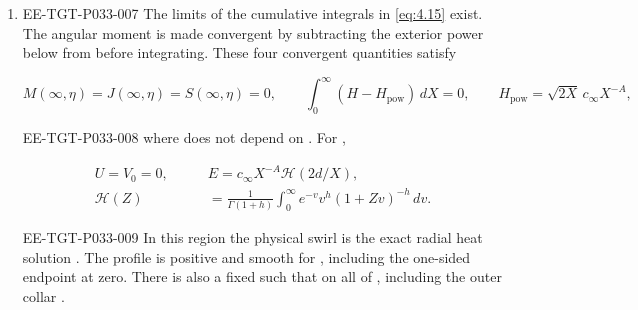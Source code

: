 \begin{theorem}
\begin{enumerate}[label=(\roman*)]
\item
\begin{EESegment}{EE-TGT-P033-007}
The limits 
of the cumulative integrals in \eqref{eq:4.15} exist. The angular moment is
made convergent by subtracting the exterior power
 below from
 before integrating. These four convergent quantities
satisfy
\end{EESegment}
\begin{equation}
  M(\infty,\eta)=J(\infty,\eta)=S(\infty,\eta)=0,\qquad
  \int_0^\infty(H-H_{\mathrm{pow}})\,dX=0,\qquad
  H_{\mathrm{pow}}=\sqrt{2X}\,c_\infty X^{-A},
  \tag{4.28}\label{eq:4.28}
\end{equation}
\begin{EESegment}{EE-TGT-P033-008}
where  does not depend on
. For ,
\end{EESegment}
\begin{equation}
\begin{aligned}
  U=V_0=0,\qquad&E=c_\infty X^{-A}\mathcal{H}(2d/X),\\
  \mathcal{H}(Z)&=\frac{1}{\Gamma(1+h)}\int_0^\infty e^{-v}v^h(1+Zv)^{-h}\,dv.
\end{aligned}
\tag{4.29}\label{eq:4.29}
\end{equation}
\begin{EESegment}{EE-TGT-P033-009}
In this region the physical swirl is the exact radial heat solution
. The profile
 is positive and smooth for
, including the one-sided endpoint at zero. There
is also a fixed  such that
 on all of
\NSi{NS-F-P033-059}{[X_v,\infty)}, including the outer collar
.
\end{EESegment}


\end{enumerate}
\end{theorem}
